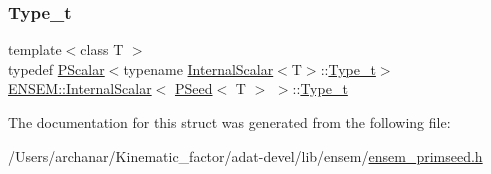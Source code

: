 \subsubsection{\texorpdfstring{Type\_t}{Type\_t}\hspace{0.1cm}{\footnotesize\ttfamily [3/3]}}
{\footnotesize\ttfamily template$<$class T $>$ \\
typedef \mbox{\hyperlink{classENSEM_1_1PScalar}{P\+Scalar}}$<$typename \mbox{\hyperlink{structENSEM_1_1InternalScalar}{Internal\+Scalar}}$<$T$>$\+::\mbox{\hyperlink{structENSEM_1_1InternalScalar_3_01PSeed_3_01T_01_4_01_4_af1fc242826d3ea17d7b76fd281a82eba}{Type\+\_\+t}}$>$ \mbox{\hyperlink{structENSEM_1_1InternalScalar}{E\+N\+S\+E\+M\+::\+Internal\+Scalar}}$<$ \mbox{\hyperlink{classENSEM_1_1PSeed}{P\+Seed}}$<$ T $>$ $>$\+::\mbox{\hyperlink{structENSEM_1_1InternalScalar_3_01PSeed_3_01T_01_4_01_4_af1fc242826d3ea17d7b76fd281a82eba}{Type\+\_\+t}}}



The documentation for this struct was generated from the following file\+:\begin{DoxyCompactItemize}
\item 
/\+Users/archanar/\+Kinematic\+\_\+factor/adat-\/devel/lib/ensem/\mbox{\hyperlink{adat-devel_2lib_2ensem_2ensem__primseed_8h}{ensem\+\_\+primseed.\+h}}\end{DoxyCompactItemize}
